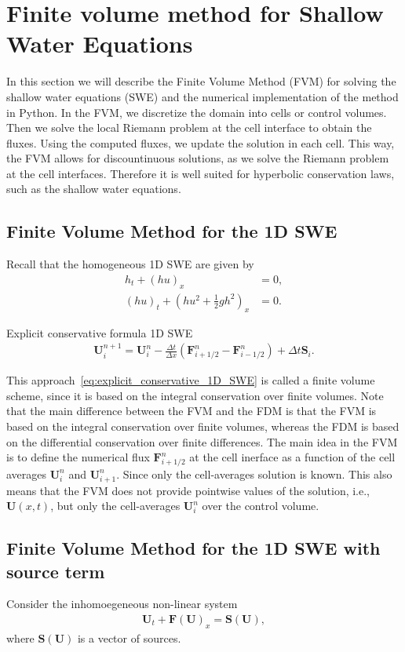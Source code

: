 \section{Finite volume method for Shallow Water Equations}
In this section we will describe the Finite Volume Method (FVM) for solving the shallow water equations (SWE) and the numerical implementation of the method in Python.
In the FVM, we discretize the domain into cells or control volumes.
Then we solve the local Riemann problem at the cell interface to obtain the fluxes.
Using the computed fluxes, we update the solution in each cell.
This way, the FVM allows for discountinuous solutions, as we solve the Riemann problem at the cell interfaces.
Therefore it is well suited for hyperbolic conservation laws, such as the shallow water equations.


\subsection{Finite Volume Method for the 1D SWE}
Recall that the homogeneous 1D SWE are given by
\begin{align*}
    h_t + {(hu)}_x &= 0, \\
    {(hu)}_t + {\left(hu^2 + \frac{1}{2}gh^2\right)}_x &= 0.
\end{align*}

Explicit conservative formula 1D SWE
\begin{align}\label{eq:explicit_conservative_1D_SWE}
    \mathbf{U}_i^{n+1} = \mathbf{U}_i^n - \frac{\Delta t}{\Delta x} \left( \mathbf{F}_{i+1/2}^n - \mathbf{F}_{i-1/2}^n \right) + \Delta t \mathbf{S}_i.
\end{align}

This approach~\eqref{eq:explicit_conservative_1D_SWE} is called a finite volume scheme, since it is based on the integral conservation over finite volumes.
Note that the main difference between the FVM and the FDM is that the FVM is based on the integral conservation over finite volumes, whereas the FDM is based on the differential conservation over finite differences.
The main idea in the FVM is to define the numerical flux $\mathbf{F}_{i+1/2}^n$ at the cell inerface as a function of the cell averages $\mathbf{U}_i^n$ and $\mathbf{U}_{i+1}^n$.
Since only the cell-averages solution is known.
This also means that the FVM does not provide pointwise values of the solution, i.e., $\mathbf{U}(x,t)$, but only the cell-averages $\mathbf{U}_i^n$ over the control volume.

\subsection{Finite Volume Method for the 1D SWE with source term}
Consider the inhomoegeneous non-linear system
\begin{align*}
    \mathbf{U}_t + \mathbf{F(U)}_x = \mathbf{S(U)},
\end{align*} 
where $\mathbf{S(U)}$ is a vector of sources. 



